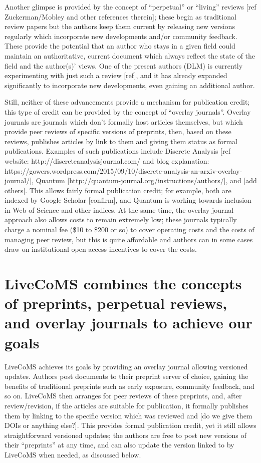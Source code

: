 \documentclass[9pt]{livecoms}
\begin{document}
Another glimpse is provided by the concept of ``perpetual'' or ``living'' reviews [ref Zuckerman/Mobley and other references therein]; these begin as traditional review papers but the authors keep them current by releasing new versions regularly which incorporate new developments and/or community feedback.
These provide the potential that an author who stays in a given field could maintain an authoritative, current document which always reflect the state of the field and the author(s)' views. 
One of the present authors (DLM) is currently experimenting with just such a review [ref], and it has already expanded significantly to incorporate new developments, even gaining an additional author.

Still, neither of these advancements provide a mechanism for publication credit; this type of credit can be provided by the concept of ``overlay journals''.
Overlay journals are journals which don't formally host articles themselves, but which provide peer reviews of specific versions of preprints, then, based on these reviews, publishes articles by link to them and giving them status as formal publications.
Examples of such publications include Discrete Analysis [ref website: http://discreteanalysisjournal.com/ and blog explanation: https://gowers.wordpress.com/2015/09/10/discrete-analysis-an-arxiv-overlay-journal/], Quantum [http://quantum-journal.org/instructions/authors/], and  [add others].
This allows fairly formal publication credit; for example, both are indexed by Google Scholar [confirm], and Quantum is working towards inclusion in Web of Science and other indices. 
At the same time, the overlay journal approach also allows costs to remain extremely low; these journals typically charge a nominal fee (\$10 to \$200 or so) to cover operating costs and the costs of managing peer review, but this is quite affordable and authors can in some cases draw on institutional open access incentives to cover the costs. 

\section{LiveCoMS combines the concepts of preprints, perpetual reviews, and overlay journals to achieve our goals}

LiveCoMS achieves its goals by providing an overlay journal allowing versioned updates.
Authors post documents to their preprint server of choice, gaining the benefits of traditional preprints such as early exposure, community feedback, and so on. 
LiveCoMS then arranges for peer reviews of these preprints, and, after review/revision, if the articles are suitable for publication, it formally publishes them by linking to the specific version which was reviewed and [do we give them DOIs or anything else?].
This provides formal publication credit, yet it still allows straightforward versioned updates; the authors are free to post new versions of their ``preprints'' at any time, and can also update the version linked to by LiveCoMS when needed, as discussed below.
\end{document}
